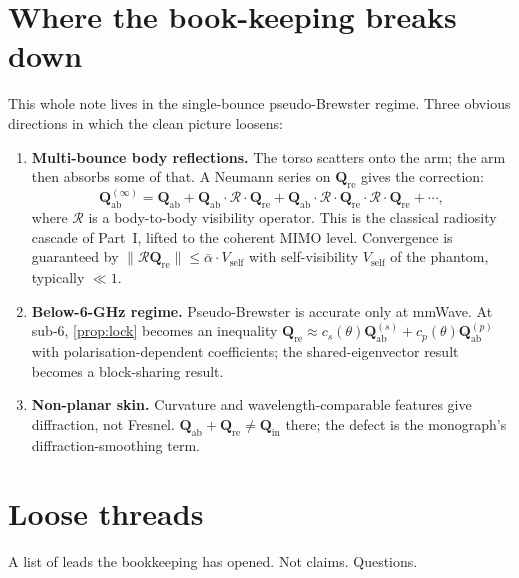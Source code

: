 \documentclass[11pt,a4paper]{article}
\theoremstyle{definition}
\newcommand{\Qabs}{\mathbf{Q}_{\mathrm{ab}}}
\newcommand{\Qref}{\mathbf{Q}_{\mathrm{re}}}
\newcommand{\Qinn}{\mathbf{Q}_{\mathrm{in}}}
\begin{document}
\section{Where the book-keeping breaks down}\label{sec:higher}

This whole note lives in the single-bounce pseudo-Brewster regime.
Three obvious directions in which the clean picture loosens:

\begin{enumerate}[leftmargin=1.6em,itemsep=2pt]
\item \textbf{Multi-bounce body reflections.}  The torso scatters
onto the arm; the arm then absorbs some of that.  A Neumann series
on $\Qref$ gives the correction:
\[
  \Qabs^{(\infty)} = \Qabs + \Qabs\cdot\mathcal{R}\cdot\Qref
  + \Qabs\cdot\mathcal{R}\cdot\Qref\cdot\mathcal{R}\cdot\Qref+\cdots,
\]
where $\mathcal{R}$ is a body-to-body visibility operator.  This is
the classical radiosity cascade of Part~I, lifted to the coherent
MIMO level.  Convergence is guaranteed by $\|\mathcal{R}\Qref\|\le
\bar\alpha\cdot V_{\mathrm{self}}$ with self-visibility
$V_{\mathrm{self}}$ of the phantom, typically $\ll 1$.
\item \textbf{Below-6-GHz regime.}  Pseudo-Brewster is accurate only
at mmWave.  At sub-6, \cref{prop:lock} becomes an inequality
$\Qref\approx c_s(\theta)\Qabs^{(s)}+c_p(\theta)\Qabs^{(p)}$ with
polarisation-dependent coefficients; the shared-eigenvector result
becomes a block-sharing result.
\item \textbf{Non-planar skin.}  Curvature and wavelength-comparable
features give diffraction, not Fresnel.  $\Qabs+\Qref\ne\Qinn$
there; the defect is the monograph's diffraction-smoothing term.
\end{enumerate}

\section{Loose threads}

A list of leads the bookkeeping has opened.  Not claims.  Questions.
\end{document}
